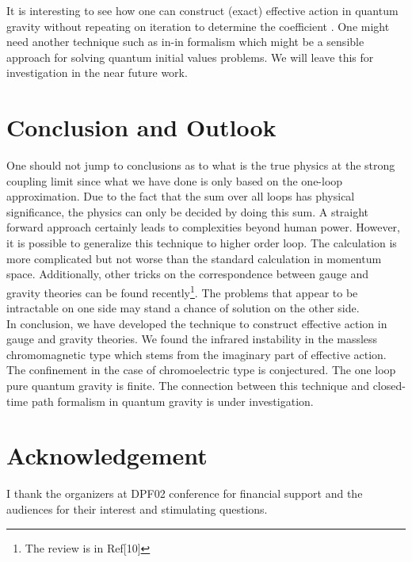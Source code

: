 \documentclass[a4paper,12 pt]{article}
\begin{document}
It is interesting to see how one can construct (exact) effective
action in quantum gravity without repeating on iteration to
determine the coefficient \coordHE{}. One might need another
technique such as in-in formalism which might be a sensible
approach for solving quantum initial values problems. We will
leave this for investigation in the near future work.
\section{Conclusion and Outlook}
One should not jump to conclusions as to what is the true physics
at the strong coupling limit since what we have done is only based
on the one-loop approximation. Due to the fact that the sum over
all loops has physical significance, the physics can only be
decided by doing this sum. A straight forward approach certainly
leads to complexities beyond human power. However, it is possible
to generalize this technique to higher order loop. The calculation
is more complicated but not worse than the standard calculation in
momentum space. Additionally, other tricks on the correspondence
between gauge and gravity theories can be found
recently\footnote{The review is in Ref[10]}. The problems that
appear to be intractable on one side may stand a
chance of solution on the other side.  \\

In conclusion, we have developed the technique to construct
effective action in gauge and gravity theories. We found the
infrared instability in the massless chromomagnetic type which
stems from the imaginary part of effective action. The confinement
in the case of chromoelectric type is conjectured. The one loop
pure quantum gravity is finite. The connection between this
technique and closed-time path formalism in quantum gravity is
under investigation.






\section{Acknowledgement}
I thank the organizers at DPF02 conference for financial support
and the audiences for their interest and stimulating questions.
\end{document}
